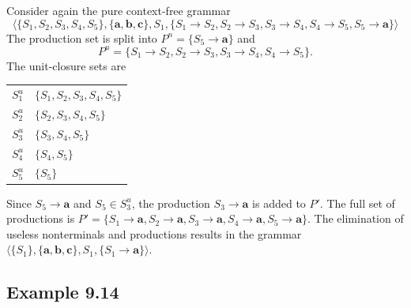 Consider again the pure context-free grammar
\[ \langle\{S_1,S_2,S_3,S_4,S_5\},\{\pmb{a},\pmb{b},\pmb{c}\},S_1,\{S_1
	\rightarrow S_2,S_2\rightarrow S_3,S_3\rightarrow S_4,S_4\rightarrow
	S_5,S_5\rightarrow\pmb{a}\}\rangle \]
The production set is split into $P^n = \{S_5\rightarrow\pmb{a}\}$ and
\[ P^u = \{S_1\rightarrow S_2,S_2\rightarrow S_3,S_3\rightarrow S_4,S_4
	\rightarrow S_5\}. \]
The unit-closure sets are
\begin{center}\begin{tabular}{r@{ = }l}
$S^u_1$ & $\{S_1,S_2,S_3,S_4,S_5\}$ \\
$S^u_2$ & $\{S_2,S_3,S_4,S_5\}$ \\
$S^u_3$ & $\{S_3,S_4,S_5\}$ \\
$S^u_4$ & $\{S_4,S_5\}$ \\
$S^u_5$ & $\{S_5\}$
\end{tabular}\end{center}
Since $S_5\rightarrow\pmb{a}$ and $S_5\in S^u_3$, the production $S_3\rightarrow
\pmb{a}$ is added to $P'$. The full set of productions is $P'=\{S_1\rightarrow
\pmb{a},S_2\rightarrow\pmb{a},S_3\rightarrow\pmb{a},S_4\rightarrow\pmb{a},S_5
\rightarrow\pmb{a}\}$. The elimination of useless nonterminals and productions
results in the grammar $\langle\{S_1\},\{\pmb{a},\pmb{b},\pmb{c}\},S_1,\{S_1
\rightarrow\pmb{a}\}\rangle$.

\subsection*{Example 9.14}

